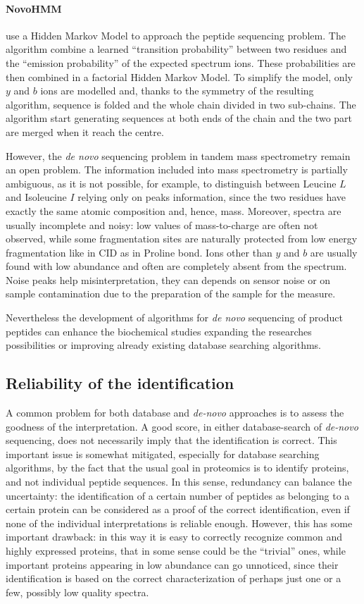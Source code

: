 \paragraph{NovoHMM}
\cite{fischer2005novohmm} use a Hidden Markov Model to approach the peptide
sequencing problem. The algorithm combine a learned ``transition probability''
between two residues and the ``emission probability'' of the expected spectrum
ions.
These probabilities are then combined in a factorial Hidden Markov Model.
To simplify the model, only $y$ and $b$ ions are modelled and, thanks to the
symmetry of the resulting algorithm, sequence is folded and the whole chain
divided in two sub-chains. The algorithm start generating sequences at both ends
of the chain and the two part are merged when it reach the centre.

However, the \emph{de novo} sequencing problem in tandem mass spectrometry
remain an open problem.
The information included into mass spectrometry is partially ambiguous, 
as it is not possible, for example, to distinguish between Leucine $L$ and Isoleucine
$I$ relying only on peaks information, since the two residues have exactly the
same atomic composition and, hence, mass. 
Moreover, spectra are usually incomplete and noisy:
low values of mass-to-charge are often not observed, while some
fragmentation sites are naturally protected from low energy fragmentation like in CID as in
Proline bond. Ions other than $y$ and $b$ are usually found with low abundance
and often are completely absent from the spectrum.
Noise peaks help misinterpretation, they can depends on sensor noise or on
sample contamination due to the preparation of the sample for the measure.

Nevertheless the development of algorithms for \emph{de novo} sequencing of
product peptides can enhance the biochemical studies expanding the researches
possibilities or improving already existing database searching algorithms.


\subsection{Reliability of the identification}
\label{sec:reliability}
A common problem for both database and \emph{de-novo} approaches  is to assess the
goodness of the interpretation.   A good score, in either database-search of
\emph{de-novo} sequencing, does not necessarily imply that  the identification is
correct.
This important issue is somewhat mitigated, especially for database searching
algorithms, by the fact that the usual goal in proteomics is to identify
proteins, and not individual peptide sequences. In this sense, redundancy can
balance the uncertainty: the identification of a certain number of peptides as
belonging to a certain protein can be considered  as a proof of the correct
identification, even if none of the individual interpretations is reliable
enough. However, this has some important drawback: in this way it is easy to
correctly recognize  common and highly expressed proteins, that in some sense
could be the ``trivial'' ones, while important proteins appearing in low
abundance can go unnoticed, since their identification is based on the correct
characterization of perhaps just one or a few, possibly low quality spectra. 

